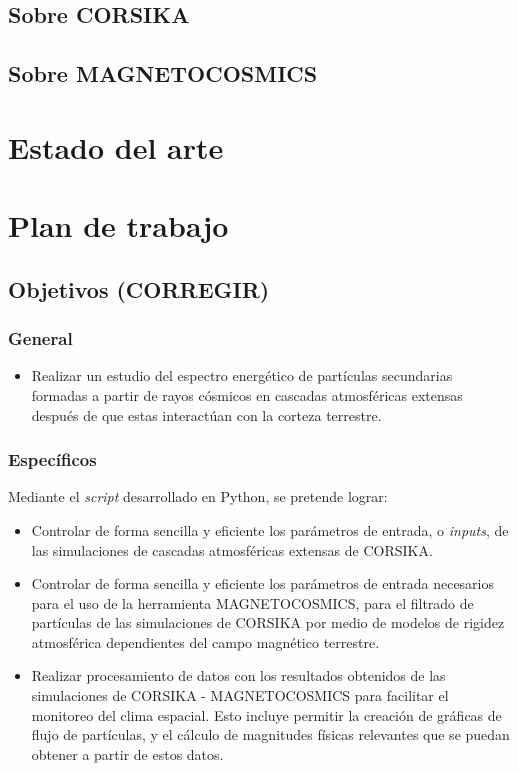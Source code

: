 \documentclass{report}
\begin{document}
\subsection*{Sobre CORSIKA}


\subsection*{Sobre MAGNETOCOSMICS}



\section*{Estado del arte}










\section*{Plan de trabajo}

\subsection*{Objetivos (CORREGIR)}

\subsubsection*{General}
\begin{itemize}
    \item Realizar un estudio del espectro energético de partículas secundarias formadas a partir de rayos cósmicos en cascadas atmosféricas extensas después de que estas interactúan con la corteza terrestre.
\end{itemize}

\subsubsection*{Específicos}
Mediante el \textit{script} desarrollado en Python, se pretende lograr:
\begin{itemize}
    \item Controlar de forma sencilla y eficiente los parámetros de entrada, o \textit{inputs}, de las simulaciones de cascadas atmosféricas extensas de CORSIKA.
    \item Controlar de forma sencilla y eficiente los parámetros de entrada necesarios para el uso de la herramienta MAGNETOCOSMICS, para el filtrado de partículas de las simulaciones de CORSIKA por medio de modelos de rigidez atmosférica dependientes del campo magnético terrestre.
    \item Realizar procesamiento de datos con los resultados obtenidos de las simulaciones de CORSIKA - MAGNETOCOSMICS para facilitar el monitoreo del clima espacial. Esto incluye permitir la creación de gráficas de flujo de partículas, y el cálculo de magnitudes físicas relevantes que se puedan obtener a partir de estos datos.
\end{itemize}
\end{document}
